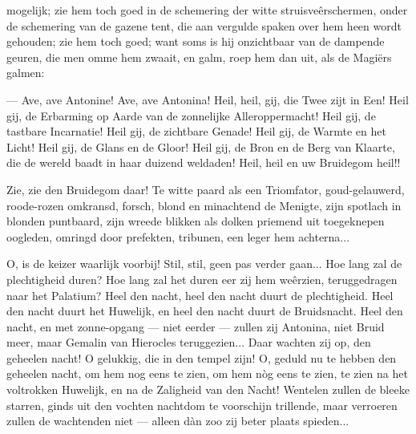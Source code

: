\documentclass[a4paper, 12pt, oneside, dutch]{article}
\begin{document}
mogelijk; zie hem toch goed in de schemering der witte struisveêrschermen, onder de schemering van de gazene tent, die aan vergulde spaken over hem heen wordt gehouden; zie hem toch goed; want soms is hij onzichtbaar van de dampende geuren, die men omme hem zwaait, en galm, roep hem dan uit, als de Magiërs galmen:

--- Ave, ave Antonine! Ave, ave Antonina! Heil, heil, gij, die Twee zijt in Een! Heil gij, de Erbarming op Aarde van de zonnelijke Alleroppermacht! Heil gij, de tastbare Incarnatie! Heil gij, de zichtbare Genade! Heil gij, de Warmte en het Licht! Heil gij, de Glans en de Gloor! Heil gij, de Bron en de Berg van Klaarte, die de wereld baadt in haar duizend weldaden! Heil, heil en uw Bruidegom heil!!

Zie, zie den Bruidegom daar! Te witte paard als een Triomfator, goud-gelauwerd, roode-rozen omkransd, forsch, blond en minachtend de Menigte, zijn spotlach in blonden puntbaard, zijn wreede blikken als dolken priemend uit toegeknepen oogleden, omringd door prefekten, tribunen, een leger hem achterna...

O, is de keizer waarlijk voorbij! Stil, stil, geen pas verder gaan... Hoe lang zal de plechtigheid duren? Hoe lang zal het duren eer zij hem weêrzien, teruggedragen naar het Palatium? Heel den nacht, heel den nacht duurt de plechtigheid. Heel den nacht duurt het Huwelijk, en heel den nacht duurt de Bruidsnacht. Heel den nacht, en met zonne-opgang --- niet eerder --- zullen zij Antonina, niet Bruid meer, maar Gemalin van Hierocles teruggezien... Daar wachten zij op, den geheelen nacht! O gelukkig, die in den tempel zijn! O, geduld nu te hebben den geheelen nacht, om hem nog eens te zien, om hem nòg eens te zien, te zien na het voltrokken Huwelijk, en na de Zaligheid van den Nacht! Wentelen zullen de bleeke starren, ginds uit den vochten nachtdom te voorschijn trillende, maar verroeren zullen de wachtenden niet --- alleen dàn zoo zij beter plaats spieden...
\end{document}
